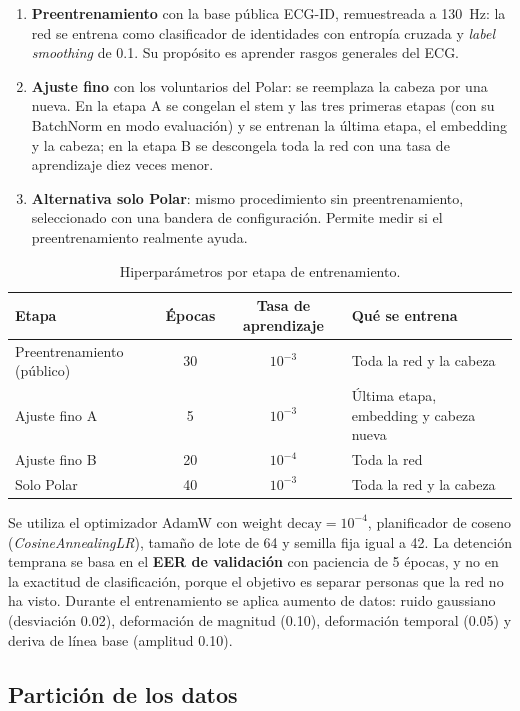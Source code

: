 \begin{enumerate}
  \item \textbf{Preentrenamiento} con la base pública ECG-ID, remuestreada a 130~Hz: la red se entrena como clasificador de identidades con entropía cruzada y \emph{label smoothing} de 0.1. Su propósito es aprender rasgos generales del ECG.
  \item \textbf{Ajuste fino} con los voluntarios del Polar: se reemplaza la cabeza por una nueva. En la etapa A se congelan el stem y las tres primeras etapas (con su BatchNorm en modo evaluación) y se entrenan la última etapa, el embedding y la cabeza; en la etapa B se descongela toda la red con una tasa de aprendizaje diez veces menor.
  \item \textbf{Alternativa solo Polar}: mismo procedimiento sin preentrenamiento, seleccionado con una bandera de configuración. Permite medir si el preentrenamiento realmente ayuda.
\end{enumerate}

\begin{table}[htbp]
\centering
\caption{Hiperparámetros por etapa de entrenamiento.}
\label{tab:hiperparametros}
\small
\begin{tabularx}{\textwidth}{X c c X}
\toprule
\textbf{Etapa} & \textbf{Épocas} & \textbf{Tasa de aprendizaje} & \textbf{Qué se entrena} \\
\midrule
Preentrenamiento (público) & 30 & $10^{-3}$ & Toda la red y la cabeza \\
Ajuste fino A & 5 & $10^{-3}$ & Última etapa, embedding y cabeza nueva \\
Ajuste fino B & 20 & $10^{-4}$ & Toda la red \\
Solo Polar & 40 & $10^{-3}$ & Toda la red y la cabeza \\
\bottomrule
\end{tabularx}
\end{table}

Se utiliza el optimizador AdamW con $\text{weight decay} = 10^{-4}$, planificador de coseno (\emph{CosineAnnealingLR}), tamaño de lote de 64 y semilla fija igual a 42. La detención temprana se basa en el \textbf{EER de validación} con paciencia de 5 épocas, y no en la exactitud de clasificación, porque el objetivo es separar personas que la red no ha visto. Durante el entrenamiento se aplica aumento de datos: ruido gaussiano (desviación 0.02), deformación de magnitud (0.10), deformación temporal (0.05) y deriva de línea base (amplitud 0.10).

\subsection{Partición de los datos}

